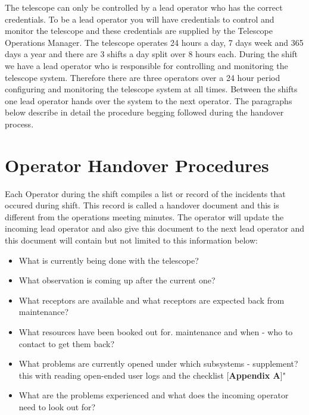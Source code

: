  

The telescope can only be controlled by a lead operator who has the correct credentials. To be a lead operator you will have credentials to control and monitor the telescope and these credentials are supplied by the Telescope Operations Manager. The telescope operates 24 hours a day, 7 days week and 365 days a year and there are 3 shifts a day split over 8 hours each. During the shift we have a lead operator who is responsible for controlling and monitoring the telescope system. Therefore there are three operators over a 24 hour period configuring and monitoring the telescope system at all times. Between the shifts one lead operator  hands over the system to the next operator. The paragraphs below describe in detail the procedure begging followed during the handover process.  
\section{Operator Handover Procedures}
Each Operator during the shift compiles a list or record  of the incidents that occured during  shift.  This record is called a handover document and this is different from the operations meeting minutes. The operator will update the incoming lead operator and also give this document to the next lead operator and this document will contain but not limited to this information below:
\begin{itemize}
\item{} What is currently being done with the telescope?
\item{} What observation is coming up after the current one?
\item{} What receptors are available and what receptors are expected back from maintenance?
\item{} What resources have been booked out for. maintenance and when - who to contact to get them back?
\item{} What problems are currently opened under which subsystems - supplement? this with reading open-ended user logs and the checklist [\textbf{Appendix A}]"
\item{} What are the problems experienced and what does the incoming operator need to look out for?
\end{itemize}
